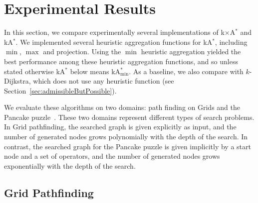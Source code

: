 \documentclass[smallextended]{svjour3}       %
\newcommand{\kD}{$k$-Dijkstra\xspace}
\newcommand{\astar}{A$^*$\xspace}
\newcommand{\kastar}{kA$^*$\xspace}
\newcommand{\kastarvar}[1]{\textup{kA}$^*_{#1}$\xspace}
\newcommand{\kastarmin}{\kastarvar{\min}}
\newcommand{\kastarmax}{\kastarvar{\max}}
\newcommand{\kxastar}{k$\times$A$^*$\xspace}
\newcommand{\minf}{$F_{min}(n)$\xspace}
\newcommand{\roni}[1]{\textbf{[RS:#1]}}
\begin{document}



\section{Experimental Results}
\label{sec:experimentalResults}

In this section, we compare experimentally several implementations of \kxastar and \kastar. 
We implemented several heuristic aggregation functions for \kastar, including $\min$, $\max$ and projection. 
Using the $\min$ heuristic aggregation yielded the best performance among these heuristic aggregation functions, and so unless stated otherwise \kastar below means \kastarmin. 
As a baseline, we also compare with \kD, which does not use any heuristic function (see Section~\ref{sec:admissibleButPossible}). 


We evaluate these algorithms on two domains: path finding on Grids and the Pancake puzzle~\cite{kleitman1975elementary}. 
These two domains represent different types of search problems. In Grid pathfinding, the searched graph is given explicitly as input, and the number of generated nodes grows polynomially with the depth of the search.  In contrast, the searched graph for the Pancake puzzle is given implicitly by a start node and a set of operators, and the number of generated nodes grows exponentially with the depth of the search.  


\subsection{Grid Pathfinding}
\end{document}

